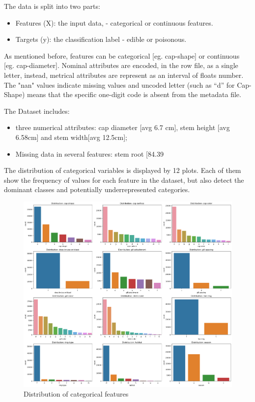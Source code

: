 \documentclass{article}
\begin{document}
 The data is split into two parts:
\begin{itemize}
    \item Features (X): the input data, - categorical or continuous features.
    \item Targets (y): the classification label - edible or poisonous.
\end{itemize}

As mentioned before, features can be categorical [eg. cap-shape] or continuous [eg. cap-diameter]. Nominal attributes are encoded, in the row file, as a single letter, instead, metrical attributes are represent as an interval of floats number. The "nan" values indicate missing values and uncoded letter (such as “d” for Cap-Shape) means that the specific one-digit code is absent from the metadata file.

The Dataset includes:
\begin{itemize}
    \item three numerical attributes: cap diameter [avg 6.7 cm], stem height [avg 6.58cm] and stem width[avg 12.5cm];
    \item Missing data in several features: stem root [84.39%
\end{itemize}

The distribution of categorical variables is displayed by 12 plots. Each of them show the frequency of values for each feature in the dataset, but also detect the dominant classes and potentially underrepresented categories.

\begin{figure}[H]
\centering
\includegraphics[width=1\linewidth]{Distribution-Cat.png}
\caption{\label{fig:frog}Distribution of categorical features}
\end{figure}
\end{document}
